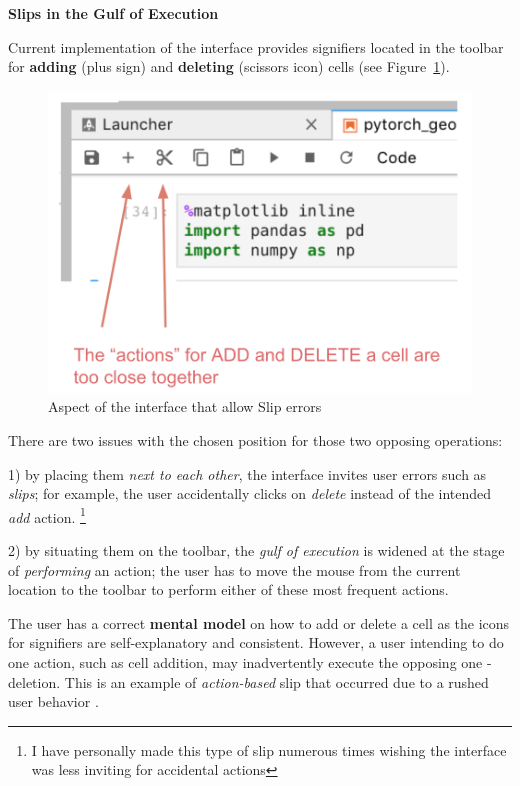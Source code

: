\documentclass[12pt,letterpaper]{article}
\begin{document}
\textbf{Slips in the Gulf of Execution} 

Current implementation of the interface provides signifiers located in the toolbar for \textbf{adding} (plus sign) and \textbf{deleting} (scissors icon) cells (see Figure~\ref{fig::2}). 

\begin{figure}[hbt!]
\centering
\includegraphics[scale=.4]{figures/project-principles/jupyter_add_delete.png}
\caption{Aspect of the interface that allow Slip errors}
\label{fig::2}
\end{figure}

There are two issues with the chosen position for those two opposing operations: 

1) by placing them \textit{next to each other}, the interface invites user errors such as \textit{slips}; for example, the user accidentally clicks on \textit{delete} instead of the intended \textit{add} action. \footnote{I have personally made this type of slip numerous times wishing the interface was less inviting for accidental actions}  

2) by situating them on the toolbar, the \textit{gulf of execution} is widened at the stage of \textit{performing} an action; the user has to move the mouse from the current location to the toolbar to perform either of these most frequent actions.

The user has a correct \textbf{mental model} on how to add or delete a cell as the icons for signifiers are self-explanatory and consistent. However, a user intending to do one action, such as cell addition, may inadvertently execute the opposing one - deletion. This is an example of \textit{action-based} slip that occurred due to a rushed user behavior \cite{norman2013design}.
\end{document}
